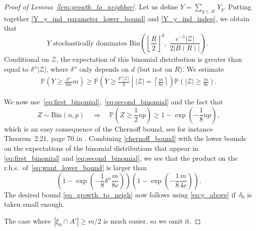 \documentclass[a4paper,12pt]{article}
\begin{document}
\begin{proof}[Proof of Lemma~\ref{lem:growth_to_neighbor}]
 Let us define $Y = \sum_{y \in A'}Y_{y}$. Putting together \eqref{Y_y_ind_parameter_lower_bound} and \eqref{Y_y_ind_indep}, we obtain that
\begin{equation} \label{eq:second_binomial}
Y \text{ stochastically dominates $\mathrm{Bin}\left( \left\lfloor \frac{R}{2}\right\rfloor^d,\;
 \frac{ e^{-1}|\mathcal{Z}|}{2|B(R)|}  \right)$. }\end{equation}
Conditional on $\mathcal{Z}$, the expectation of this binomial distribution is greater than equal to $\delta'' |\mathcal{Z}|$, where $\delta''$
only depends on $d$ (but not on $R$).
We estimate
\begin{align}
\mathbb{P}\left(Y \geq \frac{\delta''}{16e} m\right) \ge  \mathbb{P}\left(\left. Y \geq \frac{\delta''  |\mathcal{Z}|}{2} \; \right| \;|\mathcal{Z}|= \left\lceil \frac{m}{8e} \right \rceil\right)  \mathbb{P}\left(|\mathcal{Z}| \geq \frac{m}{8e}\right).\label{eq:want_lower_bound}
\end{align}

We now use~\eqref{eq:first_binomial},~\eqref{eq:second_binomial} and the fact that
\begin{equation}\label{chernoff_bound}
Z \sim \mathrm{Bin}(n,p) \quad \Longrightarrow \quad \mathbb{P}(Z \geq \textstyle{\frac{1}{2}} np) \geq 1- \exp\left(- \textstyle{\frac{1}{8}} np \right),
\end{equation}
which is an easy consequence of the Chernoff bound, see for instance Theorem~2.21, page 70 in \cite{remco}. Combining \eqref{chernoff_bound} with the lower bounds on the expectations
of the binomial distributions that appear in \eqref{eq:first_binomial} and \eqref{eq:second_binomial}, we see that
the product on the r.h.s.\ of~\eqref{eq:want_lower_bound} is larger than
$$
 \left(1- \exp\left(- \frac{1}{8} \delta'' \frac{m}{8e}  \right)\right)\left(1- \exp\left(- \frac{1}{8} \frac{m}{4 e} \right)\right) .
$$
The desired bound \eqref{eq_growth_to_neigh} now follows using \eqref{eq:y_above} if~$\delta_0$ is taken small enough.

The case where~$|\xi_0 \cap A'| \geq m/2$ is much easier, so we omit it.
\end{proof}
\end{document}
